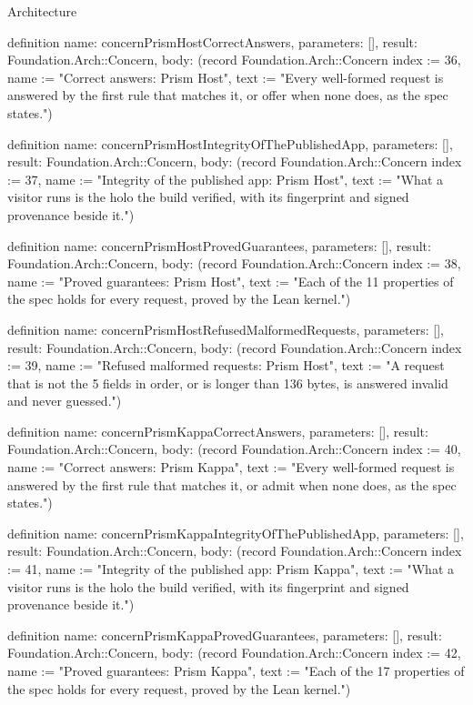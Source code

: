 \begin{lexlean}{Architecture}
\begin{semanticmodule}
definition{
  name: concernPrismHostCorrectAnswers,
  parameters: [],
  result: Foundation.Arch::Concern,
  body: (record Foundation.Arch::Concern {index := 36, name := "Correct answers: Prism Host", text := "Every well-formed request is answered by the first rule that matches it, or offer when none does, as the spec states."})
}

definition{
  name: concernPrismHostIntegrityOfThePublishedApp,
  parameters: [],
  result: Foundation.Arch::Concern,
  body: (record Foundation.Arch::Concern {index := 37, name := "Integrity of the published app: Prism Host", text := "What a visitor runs is the holo the build verified, with its fingerprint and signed provenance beside it."})
}

definition{
  name: concernPrismHostProvedGuarantees,
  parameters: [],
  result: Foundation.Arch::Concern,
  body: (record Foundation.Arch::Concern {index := 38, name := "Proved guarantees: Prism Host", text := "Each of the 11 properties of the spec holds for every request, proved by the Lean kernel."})
}

definition{
  name: concernPrismHostRefusedMalformedRequests,
  parameters: [],
  result: Foundation.Arch::Concern,
  body: (record Foundation.Arch::Concern {index := 39, name := "Refused malformed requests: Prism Host", text := "A request that is not the 5 fields in order, or is longer than 136 bytes, is answered invalid and never guessed."})
}

definition{
  name: concernPrismKappaCorrectAnswers,
  parameters: [],
  result: Foundation.Arch::Concern,
  body: (record Foundation.Arch::Concern {index := 40, name := "Correct answers: Prism Kappa", text := "Every well-formed request is answered by the first rule that matches it, or admit when none does, as the spec states."})
}

definition{
  name: concernPrismKappaIntegrityOfThePublishedApp,
  parameters: [],
  result: Foundation.Arch::Concern,
  body: (record Foundation.Arch::Concern {index := 41, name := "Integrity of the published app: Prism Kappa", text := "What a visitor runs is the holo the build verified, with its fingerprint and signed provenance beside it."})
}

definition{
  name: concernPrismKappaProvedGuarantees,
  parameters: [],
  result: Foundation.Arch::Concern,
  body: (record Foundation.Arch::Concern {index := 42, name := "Proved guarantees: Prism Kappa", text := "Each of the 17 properties of the spec holds for every request, proved by the Lean kernel."})
}


\end{semanticmodule}
\end{lexlean}
